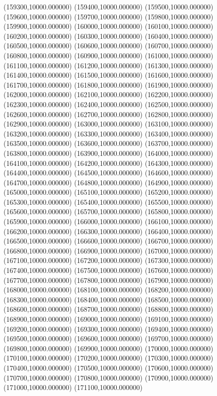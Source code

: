 (159300,10000.000000)
(159400,10000.000000)
(159500,10000.000000)
(159600,10000.000000)
(159700,10000.000000)
(159800,10000.000000)
(159900,10000.000000)
(160000,10000.000000)
(160100,10000.000000)
(160200,10000.000000)
(160300,10000.000000)
(160400,10000.000000)
(160500,10000.000000)
(160600,10000.000000)
(160700,10000.000000)
(160800,10000.000000)
(160900,10000.000000)
(161000,10000.000000)
(161100,10000.000000)
(161200,10000.000000)
(161300,10000.000000)
(161400,10000.000000)
(161500,10000.000000)
(161600,10000.000000)
(161700,10000.000000)
(161800,10000.000000)
(161900,10000.000000)
(162000,10000.000000)
(162100,10000.000000)
(162200,10000.000000)
(162300,10000.000000)
(162400,10000.000000)
(162500,10000.000000)
(162600,10000.000000)
(162700,10000.000000)
(162800,10000.000000)
(162900,10000.000000)
(163000,10000.000000)
(163100,10000.000000)
(163200,10000.000000)
(163300,10000.000000)
(163400,10000.000000)
(163500,10000.000000)
(163600,10000.000000)
(163700,10000.000000)
(163800,10000.000000)
(163900,10000.000000)
(164000,10000.000000)
(164100,10000.000000)
(164200,10000.000000)
(164300,10000.000000)
(164400,10000.000000)
(164500,10000.000000)
(164600,10000.000000)
(164700,10000.000000)
(164800,10000.000000)
(164900,10000.000000)
(165000,10000.000000)
(165100,10000.000000)
(165200,10000.000000)
(165300,10000.000000)
(165400,10000.000000)
(165500,10000.000000)
(165600,10000.000000)
(165700,10000.000000)
(165800,10000.000000)
(165900,10000.000000)
(166000,10000.000000)
(166100,10000.000000)
(166200,10000.000000)
(166300,10000.000000)
(166400,10000.000000)
(166500,10000.000000)
(166600,10000.000000)
(166700,10000.000000)
(166800,10000.000000)
(166900,10000.000000)
(167000,10000.000000)
(167100,10000.000000)
(167200,10000.000000)
(167300,10000.000000)
(167400,10000.000000)
(167500,10000.000000)
(167600,10000.000000)
(167700,10000.000000)
(167800,10000.000000)
(167900,10000.000000)
(168000,10000.000000)
(168100,10000.000000)
(168200,10000.000000)
(168300,10000.000000)
(168400,10000.000000)
(168500,10000.000000)
(168600,10000.000000)
(168700,10000.000000)
(168800,10000.000000)
(168900,10000.000000)
(169000,10000.000000)
(169100,10000.000000)
(169200,10000.000000)
(169300,10000.000000)
(169400,10000.000000)
(169500,10000.000000)
(169600,10000.000000)
(169700,10000.000000)
(169800,10000.000000)
(169900,10000.000000)
(170000,10000.000000)
(170100,10000.000000)
(170200,10000.000000)
(170300,10000.000000)
(170400,10000.000000)
(170500,10000.000000)
(170600,10000.000000)
(170700,10000.000000)
(170800,10000.000000)
(170900,10000.000000)
(171000,10000.000000)
(171100,10000.000000)

